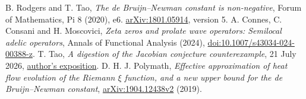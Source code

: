  B. Rodgers and T. Tao,
\emph{The de Bruijn--Newman constant is non-negative},
Forum of Mathematics, Pi 8 (2020), e6.
\href{https://arxiv.org/abs/1801.05914}{arXiv:1801.05914}, version 5.
 A. Connes, C. Consani and H. Moscovici,
\emph{Zeta zeros and prolate wave operators: Semilocal adelic operators},
Annals of Functional Analysis (2024),
\href{https://doi.org/10.1007/s43034-024-00388-z}{doi:10.1007/s43034-024-00388-z}.
 T. Tao,
\emph{A digestion of the Jacobian conjecture counterexample},
21 July 2026,
\href{https://terrytao.wordpress.com/2026/07/21/a-digestion-of-the-jacobian-conjecture-counterexample/}{author's exposition}.
 D. H. J. Polymath,
\emph{Effective approximation of heat flow evolution of the Riemann
$\xi$ function, and a new upper bound for the de Bruijn--Newman constant},
\href{https://arxiv.org/abs/1904.12438v2}{arXiv:1904.12438v2} (2019).
